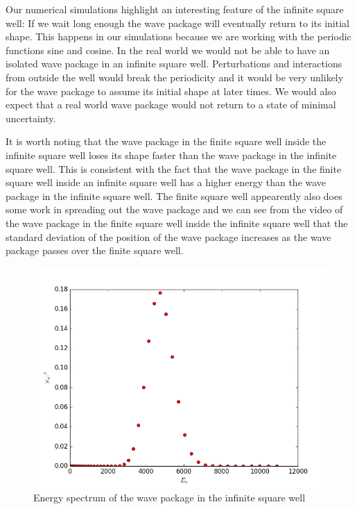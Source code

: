 \documentclass[12pt,a4paper]{article}
\begin{document}
Our numerical simulations highlight an interesting feature of the infinite square well: If we wait long enough the wave package will eventually return to its initial shape. This happens in our simulations because we are working with the periodic functions sine and cosine. In the real world we would not be able to have an isolated wave package in an infinite square well. Perturbations and interactions from outside the well would break the periodicity and it would be very unlikely for the wave package to assume its initial shape at later times. We would also expect that a real world wave package would not return to a state of minimal uncertainty.

It is worth noting that the wave package in the finite square well inside the infinite square well loses its shape faster than the wave package in the infinite square well. This is consistent with the fact that the wave package in the finite square well inside an infinite square well has a higher energy than the wave package in the infinite square well. The finite square well appearently also does some work in spreading out the wave package and we can see from the video of the wave package in the finite square well inside the infinite square well that the standard deviation of the position of the wave package increases as the wave package passes over the finite square well.

\begin{figure}
\includegraphics[width=\textwidth]{../Python/ISW_wavePackageEnergySpectrum.png}
\caption{Energy spectrum of the wave package in the infinite square well} \label{fig:energySpectrumInfinite}
\end{figure}
\end{document}
